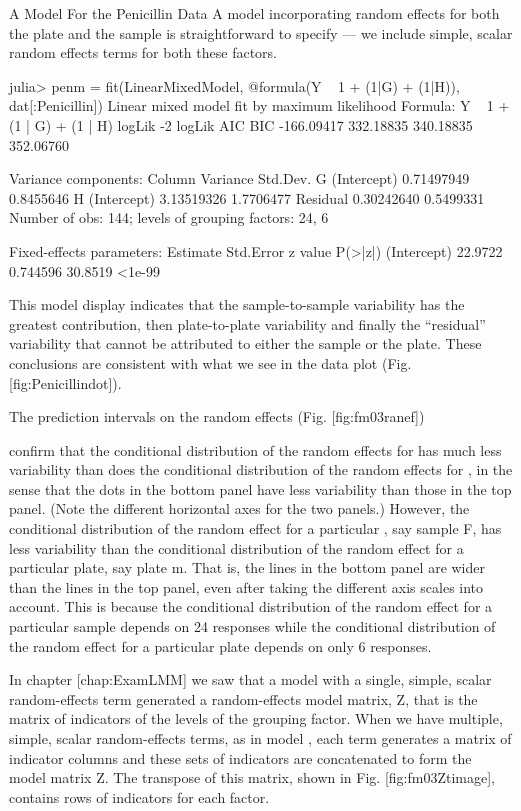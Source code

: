 A Model For the Penicillin Data
A model incorporating random effects for both the plate and the sample is straightforward to specify — we include simple, scalar random effects terms for both these factors.

julia> penm = fit(LinearMixedModel, @formula(Y ~ 1 + (1|G) + (1|H)), dat[:Penicillin])
Linear mixed model fit by maximum likelihood
 Formula: Y ~ 1 + (1 | G) + (1 | H)
   logLik   -2 logLik     AIC        BIC    
 -166.09417  332.18835  340.18835  352.06760

Variance components:
              Column    Variance   Std.Dev. 
 G        (Intercept)  0.71497949 0.8455646
 H        (Intercept)  3.13519326 1.7706477
 Residual              0.30242640 0.5499331
 Number of obs: 144; levels of grouping factors: 24, 6

  Fixed-effects parameters:
             Estimate Std.Error z value P(>|z|)
(Intercept)   22.9722  0.744596 30.8519  <1e-99

This model display indicates that the sample-to-sample variability has the greatest contribution, then plate-to-plate variability and finally the “residual” variability that cannot be attributed to either the sample or the plate. These conclusions are consistent with what we see in the data plot (Fig. [fig:Penicillindot]).

The prediction intervals on the random effects (Fig. [fig:fm03ranef])

confirm that the conditional distribution of the random effects for has much less variability than does the conditional distribution of the random effects for , in the sense that the dots in the bottom panel have less variability than those in the top panel. (Note the different horizontal axes for the two panels.) However, the conditional distribution of the random effect for a particular , say sample F, has less variability than the conditional distribution of the random effect for a particular plate, say plate m. That is, the lines in the bottom panel are wider than the lines in the top panel, even after taking the different axis scales into account. This is because the conditional distribution of the random effect for a particular sample depends on 24 responses while the conditional distribution of the random effect for a particular plate depends on only 6 responses.

In chapter [chap:ExamLMM] we saw that a model with a single, simple, scalar random-effects term generated a random-effects model matrix, Z, that is the matrix of indicators of the levels of the grouping factor. When we have multiple, simple, scalar random-effects terms, as in model , each term generates a matrix of indicator columns and these sets of indicators are concatenated to form the model matrix Z. The transpose of this matrix, shown in Fig. [fig:fm03Ztimage], contains rows of indicators for each factor.

